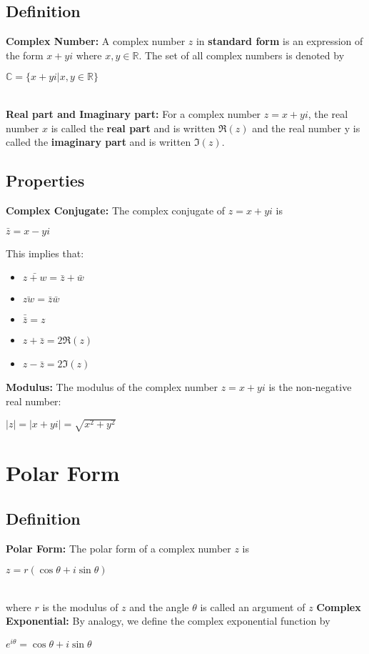 \documentclass[12pt]{report}
\begin{document}
		\subsection{Definition}
			\textbf{Complex Number:} A complex number $z$ in \textbf{standard form} is an expression of the form $x+yi$ where $x,y\in \mathbb{R}$. The set of all complex numbers is denoted by\\
			\centerline{$\mathbb{C} = \{x + yi | x,y \in \mathbb{R}\}$}
			\\
			\textbf{Real part and Imaginary part:} For a complex number $z = x + yi$, the real number $x$ is called the \textbf{real part} and is written $\Re(z)$ and the real number y is called the \textbf{imaginary part} and is written $\Im(z)$.
			\\
		\subsection{Properties}
			\textbf{Complex Conjugate:} The complex conjugate of $z = x + yi$ is \\
			\centerline{$\bar{z} = x - yi$}
			This implies that:
			\begin{itemize}
				\item $\bar{z+w} = \bar{z} + \bar{w}$
				\item $\bar{zw} = \bar{z} \bar{w}$
				\item $\bar{\bar{z}} = z$
				\item $z + \bar{z} = 2\Re(z)$
				\item $z - \bar{z} = 2\Im(z)$
			\end{itemize}
			\textbf{Modulus: } The modulus of the complex number $z = x + yi$ is the non-negative real number: \\
			\centerline{$|z| = |x + yi| = \sqrt{x^2 + y^2}$}
	\section{Polar Form}
		\subsection{Definition}
			\textbf{Polar Form:} The polar form of a complex number $z$ is \\
			\centerline{$z = r(\cos \theta + i \sin \theta)$} \\
			where $r$ is the modulus of $z$ and the angle $\theta$ is called an argument of $z$
			\textbf{Complex Exponential:} By analogy, we define the complex exponential function by\\
			\centerline{$e^{i\theta} = \cos \theta + i \sin \theta$}
\end{document}
